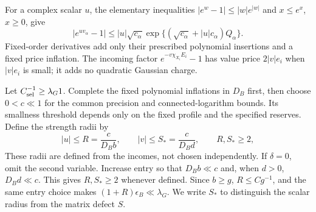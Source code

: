 \documentclass[11pt,reqno]{amsart}
\numberwithin{equation}{section}
\theoremstyle{definition}
\theoremstyle{remark}
\begin{document}
For a complex scalar \(u\), the elementary inequalities
\(|e^w-1|\le |w|e^{|w|}\) and \(x\le e^x\), \(x\ge0\), give
\begin{equation}
 |e^{uv_\alpha}-1|
 \le |u|\sqrt{c_\alpha}
       \exp\{(\sqrt{c_\alpha}+|u|c_\alpha)Q_\alpha\}.
 \label{eq:central-Gaussian-complex-Mayer}
\end{equation}
Fixed-order derivatives add only their prescribed polynomial
insertions and a fixed price inflation. The incoming factor
\(e^{-v\chi_{X_i}E_i}-1\) has value price \(2|v|e_i\)
when \(|v|e_i\) is small; it adds no quadratic Gaussian charge.

Let \(C_{\rm sel}^{-1}\ge\lambda_G1\).
Complete the fixed polynomial inflations in \(D_B\) first,
then choose \(0<c\ll1\) for the common precision and
connected-logarithm bounds. Its smallness threshold depends
only on the fixed profile and the specified reserves.
Define the strength radii by
\begin{equation}
 |u|\le R=\frac{c}{D_Bb},\qquad
 |v|\le S_*=\frac{c}{D_Bd},\qquad R,S_*\ge2,
 \label{eq:central-strength-discs}
\end{equation}
These radii are defined from the incomes, not chosen
independently. If \(\delta=0\), omit the second variable.
Increase entry so that \(D_Bb\ll c\) and, when \(d>0\),
\(D_Bd\ll c\). This gives \(R,S_*\ge2\) whenever defined.
Since \(b\ge g\), \(R\le Cg^{-1}\), and the same entry
choice makes \((1+R)\epsilon_B\ll\lambda_G\).
We write \(S_*\) to distinguish the scalar radius from
the matrix defect \(S\).
\end{document}
